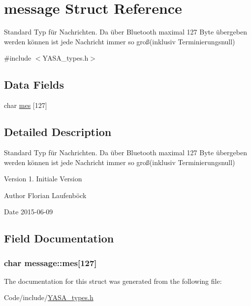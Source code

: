 \hypertarget{structmessage}{\section{message Struct Reference}
\label{structmessage}
}


Standard Typ für Nachrichten. Da über Bluetooth maximal 127 Byte übergeben werden können ist jede Nachricht immer so groß(inklusiv Terminierungsnull)  




{\ttfamily \#include $<$Y\-A\-S\-A\-\_\-types.\-h$>$}

\subsection*{Data Fields}
\begin{DoxyCompactItemize}
\item 
char \hyperlink{structmessage_a7aa45540c93ae9abbacf1ed7dd219a5b}{mes} \mbox{[}127\mbox{]}
\end{DoxyCompactItemize}


\subsection{Detailed Description}
Standard Typ für Nachrichten. Da über Bluetooth maximal 127 Byte übergeben werden können ist jede Nachricht immer so groß(inklusiv Terminierungsnull) 

\begin{DoxyVersion}{Version}
1. Initiale Version 
\end{DoxyVersion}
\begin{DoxyAuthor}{Author}
Florian Laufenböck 
\end{DoxyAuthor}
\begin{DoxyDate}{Date}
2015-\/06-\/09 
\end{DoxyDate}


\subsection{Field Documentation}
\hypertarget{structmessage_a7aa45540c93ae9abbacf1ed7dd219a5b}{
\subsubsection[{mes}]{\setlength{\rightskip}{0pt plus 5cm}char message\-::mes\mbox{[}127\mbox{]}}}\label{structmessage_a7aa45540c93ae9abbacf1ed7dd219a5b}


The documentation for this struct was generated from the following file\-:\begin{DoxyCompactItemize}
\item 
Code/include/\hyperlink{_y_a_s_a__types_8h}{Y\-A\-S\-A\-\_\-types.\-h}\end{DoxyCompactItemize}
